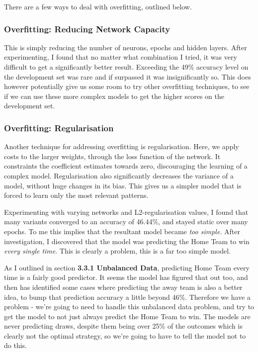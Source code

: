 \documentclass[12pt,a4paper,twoside,openright]{report}
\begin{document}
There are a few ways to deal with overfitting, outlined below.

\subsubsection{Overfitting: Reducing Network Capacity}

This is simply reducing the number of neurons, epochs and hidden layers. After experimenting, I found that no matter what combination I tried, it was very difficult to get a significantly better result. Exceeding the 49\% accuracy level on the development set was rare and if surpassed it was insignificantly so. This does however potentially give us some room to try other overfitting techniques, to see if we can use these more complex models to get the higher scores on the development set.

\subsubsection{Overfitting: Regularisation}

Another technique for addressing overfitting is regularisation. Here, we apply costs to the larger weights, through the loss function of the network. It constraints the coefficient estimates towards zero, discouraging the learning of a complex model. Regularisation also significantly decreases the variance of a model, without huge changes in its bias. This gives us a simpler model that is forced to learn only the most relevant patterns.

Experimenting with varying networks and L2-regularisation values, I found that many variants converged to an accuracy of 46.44\%, and stayed static over many epochs. To me this implies that the resultant model became \textit{too simple}. After investigation, I discovered that the model was predicting the Home Team to win \textit{every single time}. This is clearly a problem, this is a far too simple model.

As I outlined in section \textbf{3.3.1 Unbalanced Data}, predicting Home Team every time is a fairly good predictor. It seems the model has figured that out too, and then has identified some cases where predicting the away team is also a better idea, to bump that prediction accuracy a little beyond 46\%. Therefore we have a problem - we're going to need to handle this unbalanced data problem, and try to get the model to not just always predict the Home Team to win. The models are never predicting draws, despite them being over 25\% of the outcomes which is clearly not the optimal strategy, so we're going to have to tell the model not to do this.
\end{document}
